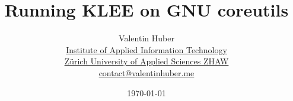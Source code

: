 \documentclass{article}
\title{Running KLEE on GNU coreutils}
\begin{document}
\author{%
    Valentin Huber\vspace{5px}\\%
    \small \href{https://www.zhaw.ch/en/engineering/institutes-centres/init/}{Institute of Applied Information Technology}\\%
    \small \href{https://www.zhaw.ch/en}{Zürich University of Applied Sciences ZHAW}\\%
    \small \href{mailto://contact@valentinhuber.me}{contact@valentinhuber.me}%
    \vspace{10px}
}

\date{\today\vspace{5px}}

\maketitle
\end{document}

